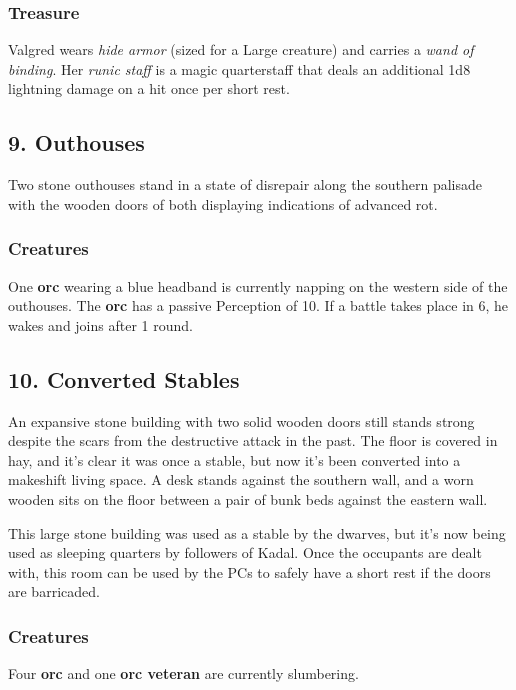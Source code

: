 \documentclass[10pt,a4paper,twoside,bg=print,twocolumn,openany,nodeprecatedcode]{dndbook}
\begin{document}
\subsubsection{Treasure}
Valgred wears \textit{hide armor} (sized for a Large creature) and carries a \textit{wand of binding}. Her \textit{runic staff} is a magic quarterstaff that deals an additional 1d8 lightning damage on a hit once per short rest.

\subsection{9. Outhouses}
\begin{DndReadAloud}{}
Two stone outhouses stand in a state of disrepair along the southern palisade with the wooden doors of both displaying indications of advanced rot.

\end{DndReadAloud}

\subsubsection{Creatures}
One \textbf{orc} wearing a blue headband is currently napping on the western side of the outhouses. The \textbf{orc} has a passive Perception of 10. If a battle takes place in 6, he wakes and joins after 1 round.

\subsection{10. Converted Stables}
\begin{DndReadAloud}{}
An expansive stone building with two solid wooden doors still stands strong despite the scars from the destructive attack in the past. The floor is covered in hay, and it's clear it was once a stable, but now it's been converted into a makeshift living space. A desk stands against the southern wall, and a worn wooden sits on the floor between a pair of bunk beds against the eastern wall.

\end{DndReadAloud}

This large stone building was used as a stable by the dwarves, but it's now being used as sleeping quarters by followers of Kadal. Once the occupants are dealt with, this room can be used by the PCs to safely have a short rest if the doors are barricaded.

\subsubsection{Creatures}
Four \textbf{orc} and one \textbf{orc veteran} are currently slumbering.
\end{document}

